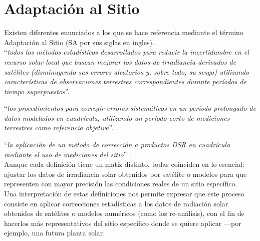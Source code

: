 \rhead{}
\cfoot{\thepage}
\renewcommand{\headrulewidth}{1pt}
\renewcommand{\footrulewidth}{1pt}

\chapter{Adaptación al Sitio}\label{ch_2}


Existen diferentes enunciados a los que se hace referencia mediante el término Adaptación al Sitio (SA  por sus siglas en ingles).\\

\enquote{\textit{todos los métodos estadísticos desarrollados para reducir la incertidumbre en el recurso solar local que buscan mejorar los datos de irradiancia derivados de satélites (disminuyendo sus errores aleatorios y, sobre todo, su sesgo) utilizando características de observaciones terrestres correspondientes durante períodos de tiempo superpuestos}}\citep{POLO2016}.


\enquote{\textit{los procedimientos para corregir errores sistemáticos en un período prolongado de datos modelados en cuadrícula, utilizando un período corto de mediciones terrestres como referencia objetiva}}\citep{YANG2021427}. 

\enquote{\textit{la aplicación de un método de corrección a productos DSR en cuadrícula mediante el uso de mediciones del sitio}} \citep{rs17101720}.\\


Aunque cada definición tiene un matiz distinto, todas coinciden en lo esencial: ajustar los datos de irradiancia solar obtenidos por satélite o modelos para que representen con mayor precisión las condiciones reales de un sitio específico.\\ 

Una interpretación de estas definiciones nos permite expresar que este proceso consiste en aplicar correcciones estadísticas a los datos de radiación solar obtenidos de satélites o modelos numéricos (como los re-análisis), con el fin de hacerlos más representativos del sitio específico donde se quiere aplicar —por ejemplo, una futura planta solar.\\




